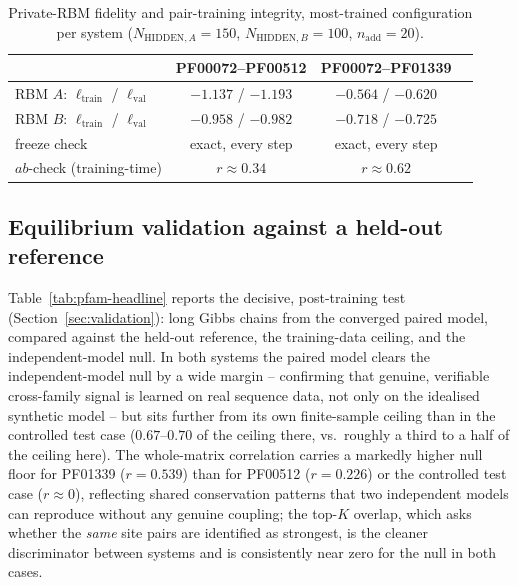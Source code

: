 \documentclass[11pt]{article}
\begin{document}
\begin{table}[htb]
\centering
\caption{Private-RBM fidelity and pair-training integrity, most-trained
configuration per system ($N_{\mathrm{HIDDEN},A}=150$,
$N_{\mathrm{HIDDEN},B}=100$, $n_{\mathrm{add}}=20$).}
\label{tab:pfam-training}
\begin{tabular}{lccc}
\toprule
 & PF00072--PF00512 & PF00072--PF01339 \\
\midrule
RBM $A$: $\ell_{\mathrm{train}}$ / $\ell_{\mathrm{val}}$ & $-1.137$ / $-1.193$ & $-0.564$ / $-0.620$ \\
RBM $B$: $\ell_{\mathrm{train}}$ / $\ell_{\mathrm{val}}$ & $-0.958$ / $-0.982$ & $-0.718$ / $-0.725$ \\
freeze check & exact, every step & exact, every step \\
$ab$-check (training-time) & $r\approx0.34$ & $r\approx0.62$ \\
\bottomrule
\end{tabular}
\end{table}

\subsection{Equilibrium validation against a held-out reference}

Table~\ref{tab:pfam-headline} reports the decisive, post-training test
(Section~\ref{sec:validation}): long Gibbs chains from the converged
paired model, compared against the held-out reference, the training-data
ceiling, and the independent-model null. In both systems the paired model
clears the independent-model null by a wide margin -- confirming that
genuine, verifiable cross-family signal is learned on real sequence data,
not only on the idealised synthetic model -- but sits further from its own
finite-sample ceiling than in the controlled test case
($0.67$--$0.70$ of the ceiling there, vs.\ roughly a third to a half of the
ceiling here). The whole-matrix correlation carries a markedly higher null
floor for PF01339 ($r=0.539$) than for PF00512 ($r=0.226$) or the
controlled test case ($r\approx0$), reflecting shared conservation
patterns that two independent models can reproduce without any genuine
coupling; the top-$K$ overlap, which asks whether the \emph{same} site
pairs are identified as strongest, is the cleaner discriminator between
systems and is consistently near zero for the null in both cases.
\end{document}
